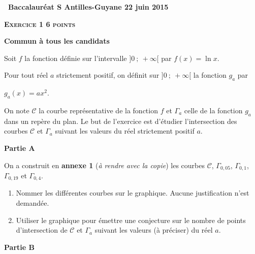 \documentclass[10pt]{article}
\begin{document}
\setlength\parindent{0mm}
\renewcommand \footrulewidth{.2pt}
\pagestyle{fancy}
\thispagestyle{empty}
\begin{center} {\Large{\textbf{\decofourleft~Baccalauréat S Antilles-Guyane 22 juin 2015~\decofourright
}}} 

\end{center}

\vspace{0,5cm}

\textbf{\textsc{Exercice 1 \hfill 6 points}}

\textbf{Commun à tous les candidats} 

\medskip

Soit $f$ la fonction définie sur l'intervalle $]0~;~+ \infty[$ par $f(x) = \ln x$.

Pour tout réel $a$ strictement positif, on définit sur $]0~;~+ \infty[$ la fonction $g_a$ par 

$g_a(x) = ax^2$.

On note $\mathcal{C}$ la courbe représentative de la fonction $f$ et $\Gamma_a$ celle de la fonction $g_a$ dans un repère du plan. Le but de l'exercice est d'étudier l'intersection des courbes $\mathcal{C}$ et $\Gamma_a$ suivant les valeurs du réel strictement positif $a$.

\bigskip

\textbf{Partie A}

\medskip

On a construit en \textbf{annexe 1} (\emph{à rendre avec la copie}) les courbes $\mathcal{C}$, $\Gamma_{0,05}$, $\Gamma_{0,1}$, $\Gamma_{0,19}$ et $\Gamma_{0,4}$.

\medskip

\begin{enumerate}
\item Nommer les différentes courbes sur le graphique. Aucune justification n'est demandée.
\item Utiliser le graphique pour émettre une conjecture sur le nombre de points d'intersection de
$\mathcal{C}$ et $\Gamma_a$ suivant les valeurs (à préciser) du réel $a$.
\end{enumerate}
 
\bigskip
 
\textbf{Partie B}

\medskip
\end{document}
